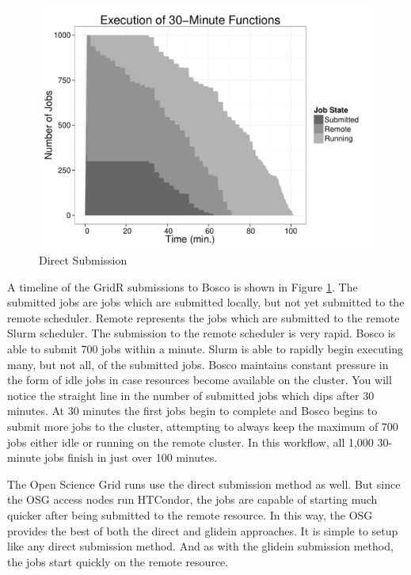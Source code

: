 \begin{figure}[h!t]
\centering
\includegraphics[width=\textwidth]{BoscoRImages/30minplot-color.pdf}

\caption{Direct Submission}
\label{fig:directsubmit}
\end{figure}

A timeline of the GridR submissions to Bosco is shown in Figure \ref{fig:directsubmit}.  The submitted jobs are jobs which are submitted locally, but not yet submitted to the remote scheduler.  Remote represents the jobs which are submitted to the remote Slurm scheduler.  The submission to the remote scheduler is very rapid.  Bosco is able to submit 700 jobs within a minute.  Slurm is able to rapidly begin executing many, but not all, of the submitted jobs.  Bosco maintains constant pressure in the form of idle jobs in case resources become available on the cluster.  You will notice the straight line in the number of submitted jobs which dips after 30 minutes.  At 30 minutes the first jobs begin to complete and Bosco begins to submit more jobs to the cluster, attempting to always keep the maximum of 700 jobs either idle or running on the remote cluster.  In this workflow, all 1,000 30-minute jobs finish in just over 100 minutes.

The Open Science Grid runs use the direct submission method as well.  But since the OSG access nodes run HTCondor, the jobs are capable of starting much quicker after being submitted to the remote resource.  In this way, the OSG provides the best of both the direct and glidein approaches.  It is simple to setup like any direct submission method.  And as with the glidein submission method, the jobs start quickly on the remote resource.

